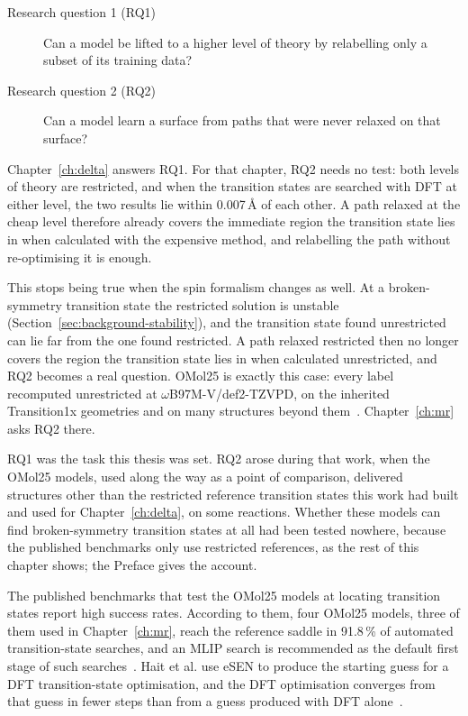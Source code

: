 \noindent
\begin{minipage}{\linewidth}
\begin{description}
  \item[Research question 1 (RQ1)] Can a model be lifted to a higher
    level of theory by relabelling only a subset of its training data?
  \item[Research question 2 (RQ2)] Can a model learn a surface from
    paths that were never relaxed on that surface?
\end{description}
\end{minipage}

Chapter~\ref{ch:delta} answers RQ1. For that chapter, RQ2 needs no
test: both levels of theory are restricted, and when the transition
states are searched with DFT at either level, the two results lie
within 0.007\,\AA{} of each other. A path relaxed at the cheap level
therefore already covers the immediate region the transition state
lies in when calculated with the expensive method, and relabelling the
path without re-optimising it is enough.

This stops being true when the spin formalism changes as well. At a
broken-symmetry transition state the restricted solution is unstable
(Section~\ref{sec:background-stability}), and the transition state
found unrestricted can lie far from the one found restricted. A path
relaxed restricted then no longer covers the region the transition
state lies in when calculated unrestricted, and RQ2 becomes a real
question. OMol25 is exactly this case: every label recomputed
unrestricted at \mbox{$\omega$B97M-V/def2-TZVPD}, on the inherited
Transition1x geometries and on many structures beyond
them~\cite{omol25}. Chapter~\ref{ch:mr} asks RQ2 there.

RQ1 was the task this thesis was set. RQ2 arose during that work,
when the OMol25 models, used along the way as a point of comparison,
delivered structures other than the restricted reference transition
states this work had built and used for Chapter~\ref{ch:delta}, on
some reactions. Whether these models can find broken-symmetry
transition states at all had been tested nowhere, because the
published benchmarks only use restricted references, as the rest of
this chapter shows; the Preface gives the account.

The published benchmarks that test the OMol25 models at locating
transition states report high success rates. According to them, four
OMol25 models, three
of them used in Chapter~\ref{ch:mr}, reach the reference saddle in 91.8\,\% of
automated transition-state searches, and an MLIP search is recommended
as the default first stage of such searches~\cite{marks2026}. Hait et
al. use eSEN to produce the starting guess for a DFT transition-state
optimisation, and the DFT optimisation converges from that guess in
fewer steps than from a guess produced with DFT alone~\cite{hait2025}.

